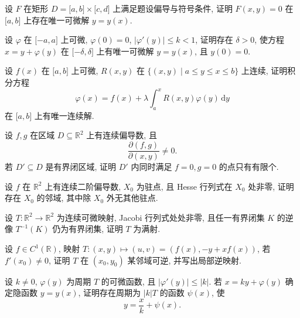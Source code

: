 \documentclass[../数学分析培优讲义.tex]{subfiles}
\begin{document}
\begin{example}
设 $F$ 在矩形 $D=\lbrack a,b\rbrack\times\lbrack c,d\rbrack$ 上满足题设偏导与符号条件, 证明 $F(x,y)=0$ 在 $\lbrack a,b\rbrack$ 上存在唯一可微解 $y=y(x)$.
\end{example}
\exampleblank

\begin{example}
设 $\varphi$ 在 $\lbrack-a,a\rbrack$ 上可微, $\varphi(0)=0$, $|\varphi'(y)|\leq k<1$, 证明存在 $\delta>0$, 使方程 $x=y+\varphi(y)$ 在 $\lbrack-\delta,\delta\rbrack$ 上有唯一可微解 $y=y(x)$, 且 $y(0)=0$.
\end{example}
\exampleblank

\begin{example}
设 $f(x)$ 在 $\lbrack a,b\rbrack$ 上可微, $R(x,y)$ 在 $\{(x,y)\mid a\leq y\leq x\leq b\}$ 上连续, 证明积分方程
\[
    \varphi(x)=f(x)+\lambda\int_a^xR(x,y)\varphi(y)\,\mathrm{d}y
\]
在 $\lbrack a,b\rbrack$ 上有唯一连续解.
\end{example}
\exampleblank

\begin{example}
设 $f,g$ 在区域 $D\subseteq\mathbb{R}^2$ 上有连续偏导数, 且
\[
    \dfrac{\partial(f,g)}{\partial(x,y)}\ne0.
\]
若 $D'\subseteq D$ 是有界闭区域, 证明 $D'$ 内同时满足 $f=0,g=0$ 的点只有有限个.
\end{example}
\exampleblank

\begin{example}
设 $f$ 在 $\mathbb{R}^2$ 上有连续二阶偏导数, $X_0$ 为驻点, 且 Hesse 行列式在 $X_0$ 处非零, 证明存在 $X_0$ 的邻域, 其中除 $X_0$ 外无其他驻点.
\end{example}
\exampleblank

\begin{example}
设 $T:\mathbb{R}^2\to\mathbb{R}^2$ 为连续可微映射, Jacobi 行列式处处非零, 且任一有界闭集 $K$ 的逆像 $T^{-1}(K)$ 仍为有界闭集, 证明 $T$ 为满射.
\end{example}
\exampleblank

\begin{example}
设 $f\in C^1(\mathbb{R})$, 映射 $T:(x,y)\mapsto(u,v)=(f(x),-y+xf(x))$, 若 $f'(x_0)\ne0$, 证明 $T$ 在 $(x_0,y_0)$ 某邻域可逆, 并写出局部逆映射.
\end{example}
\exampleblank

\begin{example}
设 $k\ne0$, $\varphi(y)$ 为周期 $T$ 的可微函数, 且 $|\varphi'(y)|\leq|k|$. 若 $x=ky+\varphi(y)$ 确定隐函数 $y=y(x)$, 证明存在周期为 $|k|T$ 的函数 $\psi(x)$, 使
\[
    y=\dfrac{x}{k}+\psi(x).
\]
\end{example}
\exampleblank
\end{document}
